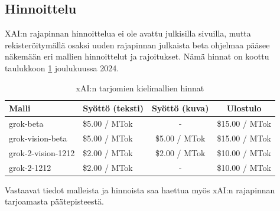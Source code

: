 \subsection{Hinnoittelu}

XAI:n rajapinnan hinnoittelua ei ole avattu julkisilla sivuilla, mutta
rekisteröitymällä osaksi uuden rajapinnan julkaista beta ohjelmaa pääsee
näkemään eri mallien hinnoittelut ja rajoitukset. Nämä hinnat on koottu
taulukkoon \ref{tab:grok-prices} joulukuussa 2024.

\begin{table}[H]
    \centering
    \caption{xAI:n tarjomien kielimallien hinnat}
    \label{tab:grok-prices}
    \begin{tabular}{llcc}
        \textbf{Malli} & \textbf{Syöttö (teksti)} & \textbf{Syöttö (kuva)} & \textbf{Ulostulo} \\
        \hline
        grok-beta          & \$5.00 / MTok &             - & \$15.00 / MTok \\
        grok-vision-beta   & \$5.00 / MTok & \$5.00 / MTok & \$15.00 / MTok \\
        grok-2-vision-1212 & \$2.00 / MTok & \$2.00 / MTok & \$10.00 / MTok \\
        grok-2-1212        & \$2.00 / MTok &             - & \$10.00 / MTok \\
        \hline
    \end{tabular}
\end{table}

Vastaavat tiedot malleista ja hinnoista saa haettua myös xAI:n rajapinnan
tarjoamasta päätepisteestä. \parencite{xAIDocsEndpoints}
